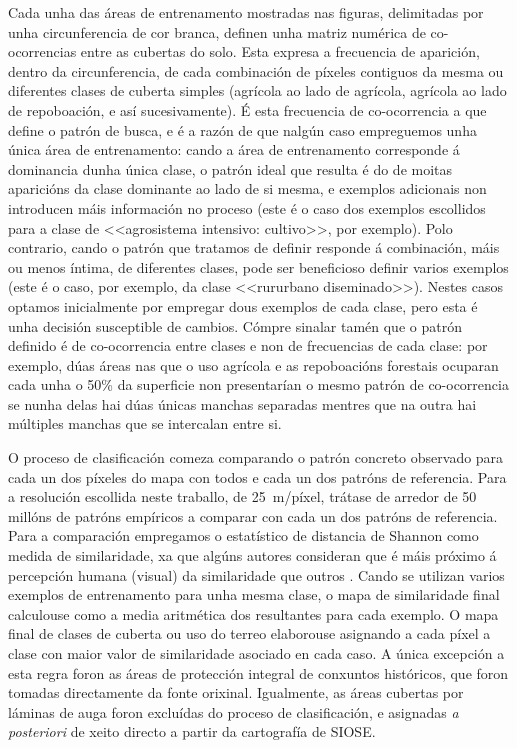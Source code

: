 \documentclass[11pt,a4paper]{article}
\begin{document}
Cada unha das áreas de entrenamento mostradas nas figuras, delimitadas por unha circunferencia de cor branca, definen unha matriz numérica de co-ocorrencias entre as cubertas do solo. Esta expresa a frecuencia de aparición, dentro da circunferencia, de cada combinación de píxeles contiguos da mesma ou diferentes clases de cuberta simples (agrícola ao lado de agrícola, agrícola ao lado de repoboación, e así sucesivamente). É esta frecuencia de co-ocorrencia a que define o patrón de busca, e é a razón de que nalgún caso empreguemos unha única área de entrenamento: cando a área de entrenamento corresponde á dominancia dunha única clase, o patrón ideal que resulta é do de moitas aparicións da clase dominante ao lado de si mesma, e exemplos adicionais non introducen máis información no proceso (este é o caso dos exemplos escollidos para a clase de <<agrosistema intensivo: cultivo>>, por exemplo). Polo contrario, cando o patrón que tratamos de definir responde á combinación, máis ou menos íntima, de diferentes clases, pode ser beneficioso definir varios exemplos (este é o caso, por exemplo, da clase <<rururbano diseminado>>). Nestes casos optamos inicialmente por empregar dous exemplos de cada clase, pero esta é unha decisión susceptible de cambios. Cómpre sinalar tamén que o patrón definido é de co-ocorrencia entre clases e non de frecuencias de cada clase: por exemplo, dúas áreas nas que o uso agrícola e as repoboacións forestais ocuparan cada unha o 50\% da superficie non presentarían o mesmo patrón de co-ocorrencia se nunha delas hai dúas únicas manchas separadas mentres que na outra hai múltiples manchas que se intercalan entre si.

O proceso de clasificación comeza comparando o patrón concreto observado para cada un dos píxeles do mapa con todos e cada un dos patróns de referencia. Para a resolución escollida neste traballo, de 25~m/píxel, trátase de arredor de 50 millóns de patróns empíricos a comparar con cada un dos patróns de referencia. Para a comparación empregamos o estatístico de distancia de Shannon \citep{Cha2007} como medida de similaridade, xa que algúns autores consideran que é máis próximo á percepción humana (visual) da similaridade que outros \citep{Jasiewicz2014104}. Cando se utilizan varios exemplos de entrenamento para unha mesma clase, o mapa de similaridade final calculouse como a media aritmética dos resultantes para cada exemplo. O mapa final de clases de cuberta ou uso do terreo elaborouse asignando a cada píxel a clase con maior valor de similaridade asociado en cada caso. A única excepción a esta regra foron as áreas de protección integral de conxuntos históricos, que foron tomadas directamente da fonte orixinal. Igualmente, as áreas cubertas por láminas de auga foron excluídas do proceso de clasificación, e asignadas \emph{a posteriori} de xeito directo a partir da cartografía de SIOSE.
\end{document}
